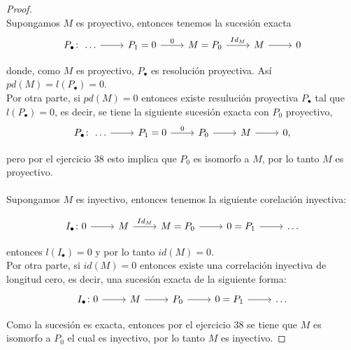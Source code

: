 \documentclass{article}
\begin{document}
\begin{enumerate}[label=\textbf{Ej \arabic*.}]
\begin{proof}
\\
Supongamos $M$ es proyectivo, entonces tenemos la sucesión exacta 
\[
\begin{tikzcd}
 P_\bullet \colon\,\ldots\arrow{r}{} & P_1=0 \arrow{r}{0}& M=P_0 \arrow{r}{Id_M} & M\arrow{r}{} &0
\end{tikzcd}
\]

donde, como $M$ es proyectivo, $P_\bullet$ es resolución proyectiva. Así \\ $pd(M)=l(P_\bullet)=0$.\\

Por otra parte, si $pd(M)=0$ entonces existe resulución proyectiva $P_\bullet$ tal que $l(P_\bullet)=0$, es decir, se tiene la siguiente 
sucesión exacta con $P_0$ proyectivo,
\[
\begin{tikzcd}
 P_\bullet \colon\,\ldots\arrow{r}{} & P_1=0 \arrow{r}{0}& P_0 \arrow{r}{} & M\arrow{r}{} &0,
\end{tikzcd}
\]

pero por el ejercicio 38 esto implica que $P_0$ es isomorfo a $M$, por lo tanto $M$ es proyectivo.\\
\\
Supongamos $M$ es inyectivo, entonces tenemos la siguiente corelación inyectiva:

\[
\begin{tikzcd}
 I_\bullet \colon 0\arrow{r}{} & M \arrow{r}{Id_M} & M=P_0\arrow{r}{} &0=P_1\arrow{r}{}&\ldots
\end{tikzcd}
\]

entonces $l( I_\bullet)=0$ y por lo tanto $id(M)=0.$\\

Por otra parte, si $id(M)=0$ entonces existe una correlación inyectiva de longitud cero, es decir, una sucesión exacta de la siguiente forma:
\[
\begin{tikzcd}
 I_\bullet \colon 0\arrow{r}{} & M \arrow{r}{} & P_0\arrow{r}{} &0=P_1\arrow{r}{}&\ldots
\end{tikzcd}
\]

Como la sucesión es exacta, entonces por el ejercicio 38 se tiene que $M$ es isomorfo a $P_0$ el cual es inyectivo, por lo tanto $M$ es inyectivo.










\end{proof}








\end{enumerate}
\end{document}
